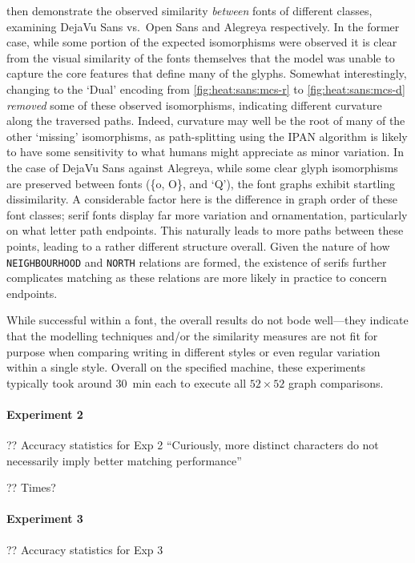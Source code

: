 \documentclass{mpaper}
\begin{document}
 then demonstrate the observed similarity \emph{between} fonts of different classes, examining DejaVu Sans vs.\ Open Sans and Alegreya respectively.
In the former case, while some portion of the expected isomorphisms were observed it is clear from the visual similarity of the fonts themselves that the model was unable to capture the core features that define many of the glyphs.
Somewhat interestingly, changing to the `Dual' encoding from \cref{fig:heat:sans:mcs-r} to \cref{fig:heat:sans:mcs-d} \emph{removed} some of these observed isomorphisms, indicating different curvature along the traversed paths.
Indeed, curvature may well be the root of many of the other `missing' isomorphisms, as path-splitting using the IPAN algorithm is likely to have some sensitivity to what humans might appreciate as minor variation.
In the case of DejaVu Sans against Alegreya, while some clear glyph isomorphisms are preserved between fonts (\{o, O\}, and `Q'), the font graphs exhibit startling dissimilarity.
A considerable factor here is the difference in graph order of these font classes; serif fonts display far more variation and ornamentation, particularly on what letter path endpoints.
This naturally leads to more paths between these points, leading to a rather different structure overall.
Given the nature of how \texttt{NEIGHBOURHOOD} and \texttt{NORTH} relations are formed, the existence of serifs further complicates matching as these relations are more likely in practice to concern endpoints.

While successful within a font, the overall results do not bode well---they indicate that the modelling techniques and/or the similarity measures are not fit for purpose when comparing writing in different styles or even regular variation within a single style.
Overall on the specified machine, these experiments typically took around \SI{30}{\minute} each to execute all $52\times52$ graph comparisons.

\paragraph{Experiment 2}
?? Accuracy statistics for Exp 2 ``Curiously, more distinct characters do not necessarily imply better matching performance''

?? Times?

\paragraph{Experiment 3}
?? Accuracy statistics for Exp 3
\end{document}
